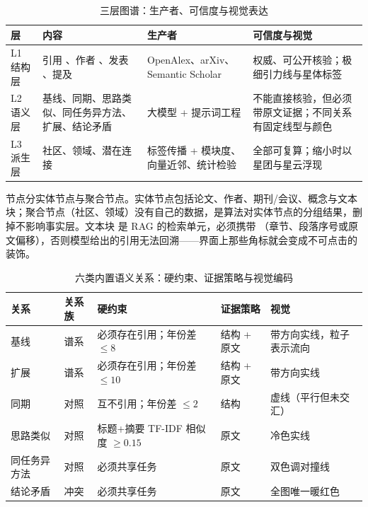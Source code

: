 \begin{table}[htbp]
  \centering
  \small
  \caption{三层图谱：生产者、可信度与视觉表达}
  \label{tab:layers}
  \begin{tabularx}{\textwidth}{L{1.5cm}L{4.4cm}L{3.2cm}Y}
    \toprule
\textbf{层} & \textbf{内容} & \textbf{生产者} & \textbf{可信度与视觉} \\
    \midrule
    L1 结构层 & 引用 、作者 、发表 、提及  & OpenAlex、arXiv、Semantic Scholar & 权威、可公开核验；极细引力线与星体标签 \\
    L2 语义层 & 基线、同期、思路类似、同任务异方法、扩展、结论矛盾 & 大模型 + 提示词工程 & 不能直接核验，但必须带原文证据；不同关系有固定线型与颜色 \\
    L3 派生层 & 社区、领域、潜在连接 & 标签传播 + 模块度、向量近邻、统计检验 & 全部可复算；缩小时以星团与星云浮现 \\
    \bottomrule
  \end{tabularx}
\end{table}

节点分实体节点与聚合节点。实体节点包括论文、作者、期刊/会议、概念与文本块；聚合节点（社区、领域）没有自己的数据，是算法对实体节点的分组结果，删掉不影响事实层。文本块  是 RAG 的检索单元，必须携带 （章节、段落序号或原文偏移），否则模型给出的引用无法回溯——界面上那些角标就会变成不可点击的装饰。

\begin{table}[htbp]
  \centering
  \small
  \caption{六类内置语义关系：硬约束、证据策略与视觉编码}
  \label{tab:relations}
  \begin{tabularx}{\textwidth}{L{2.0cm}L{2.2cm}L{4.3cm}L{2.4cm}Y}
    \toprule
\textbf{关系} & \textbf{关系族} & \textbf{硬约束} & \textbf{证据策略} & \textbf{视觉} \\
    \midrule
    基线 & 谱系 & 必须存在引用；年份差 $\le 8$ & 结构 + 原文 & 带方向实线，粒子表示流向 \\
    扩展 & 谱系 & 必须存在引用；年份差 $\le 10$ & 结构 + 原文 & 带方向实线 \\
    同期 & 对照 & 互不引用；年份差 $\le 2$ & 结构 & 虚线（平行但未交汇） \\
    思路类似 & 对照 & 标题+摘要 TF-IDF 相似度 $\ge 0.15$ & 原文 & 冷色实线 \\
    同任务异方法 & 对照 & 必须共享任务 & 原文 & 双色调对撞线 \\
    结论矛盾 & 冲突 & 必须共享任务 & 原文 & 全图唯一暖红色 \\
    \bottomrule
  \end{tabularx}
\end{table}

